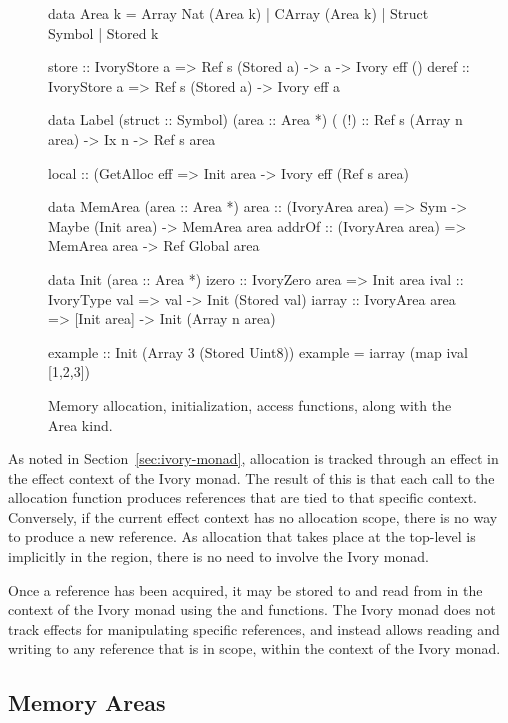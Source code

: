 \begin{figure}[t]
\begin{code}
data Area k = Array Nat (Area k)
            | CArray (Area k)
            | Struct Symbol
            | Stored k

store :: IvoryStore a
      => Ref s (Stored a) -> a -> Ivory eff ()
deref :: IvoryStore a
      => Ref s (Stored a) -> Ivory eff a

data Label (struct :: Symbol) (area :: Area *)
(%
(!)  :: Ref s (Array n area) -> Ix n -> Ref s area

local  :: (GetAlloc eff %
       => Init area -> Ivory eff (Ref s area)

data MemArea (area :: Area *)
area   :: (IvoryArea area)
       => Sym -> Maybe (Init area) -> MemArea area
addrOf :: (IvoryArea area)
       => MemArea area -> Ref Global area

data Init (area :: Area *)
izero  :: IvoryZero area => Init area
ival   :: IvoryType val  => val -> Init (Stored val)
iarray :: IvoryArea area
       => [Init area] -> Init (Array n area)

example :: Init (Array 3 (Stored Uint8))
example  = iarray (map ival [1,2,3])
\end{code}
\caption{Memory allocation, initialization, access functions, along
  with the Area kind.}
\label{fig:mem-alloc}
\end{figure}

As noted in Section~\ref{sec:ivory-monad}, allocation is tracked through an
effect in the effect context of the Ivory monad.  The result of this is that
each call to the  allocation function produces references that are
tied to that specific context.  Conversely, if the current effect context has
no allocation scope, there is no way to produce a new reference.  As allocation
that takes place at the top-level is implicitly in the  region, there
is no need to involve the Ivory monad.

Once a reference has been acquired, it may be stored to and read from in the
context of the Ivory monad using the  and  functions.  The
Ivory monad does not track effects for manipulating specific references, and
instead allows reading and writing to any reference that is in scope, within the
context of the Ivory monad.

\subsection{Memory Areas}
\label{sec:area}

